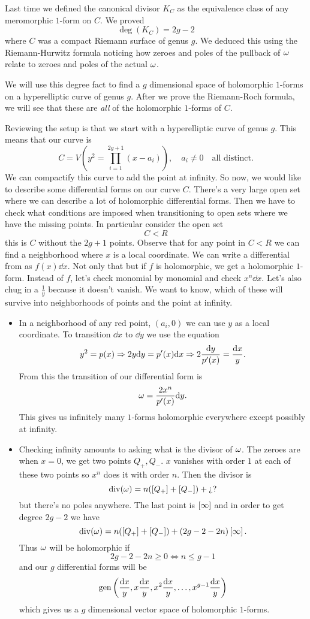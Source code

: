 \documentclass[12pt]{memoir}
\begin{document}
Last time we defined the canonical divisor $K_C$ as the equivalence class of any meromorphic $1$-form on $C$. We proved 
$$\deg(K_C)=2g-2$$
where $C$ was a compact Riemann surface of genus $g$. We deduced this using the Riemann-Hurwitz formula noticing how zeroes and poles of the pullback of $\omega$ relate to zeroes and poles of the actual $\omega$.\par
We will use this degree fact to find a $g$ dimensional space of holomorphic $1$-forms on a hyperelliptic curve of genus $g$. After we prove the Riemann-Roch formula, we will see that these are \emph{all} of the holomorphic $1$-forms of $C$.\par
Reviewing the setup is that we start with a hyperelliptic curve of genus $g$. This means that our curve is 
$$C=V\left(y^2=\prod_{i=1}^{2g+1}(x-a_i)\right),\quad a_i\neq 0\quad\text{all distinct}.$$
We can compactify this curve to add the point at infinity. So now, we would like to describe some differential forms on our curve $C$. There's a very large open set where we can describe a lot of holomorphic differential forms. Then we have to check what conditions are imposed when transitioning to open sets where we have the missing points. In particular consider the open set
$$C\less R$$
this is $C$ without the $2g+1$  points. Observe that for any point in $C\less R$ we can find a neighborhood where $x$ is a local coordinate. We can write a differential from as $f(x)\dd x$. Not only that but if $f$ is holomorphic, we get a holomorphic $1$-form. Instead of $f$, let's check monomial by monomial and check $x^n\dd x$. Let's also chug in a $\frac1y$ because it doesn't vanish. We want to know, which of these will survive into neighborhoods of  points and the point at infinity.
\begin{itemize}
    \item In a neighborhood of any red point, $(a_i,0)$ we can use $y$ as a local coordinate. To transition $\dd x$ to $\dd y$ we use the equation 
    $$y^2=p(x)\Rightarrow 2y\dd y=p'(x)\dd x\Rightarrow 2\frac{\dd y}{p'(x)}=\frac{\dd x}{y}.$$
    From this the transition of our differential form is 
    $$\omega=\frac{2x^n}{p'(x)}\dd y.$$
    This gives us infinitely many $1$-forms holomorphic everywhere except possibly at infinity.
    \item Checking infinity amounts to asking what is the divisor of $\omega$. The zeroes are when $x=0$, we get two points $Q_+,Q_-$. $x$ vanishes with order $1$ at each of these two points so $x^n$ does it with order $n$. Then the divisor is 
    $$\operatorname{div}(\omega)=n(\left\lbrack Q_+\right\rbrack+\left\lbrack Q_-\right\rbrack)+\text{¿?}$$
    but there's no poles anywhere. The last point is $\left\lbrack\infty\right\rbrack$ and in order to get degree $2g-2$ we have
    $$\operatorname{div}(\omega)=n(\left\lbrack Q_+\right\rbrack+\left\lbrack Q_-\right\rbrack)+(2g-2-2n)\left\lbrack\infty\right\rbrack.$$
    Thus $\omega$ will be holomorphic if 
    $$2g-2-2n\geq 0\iff n\leq g-1$$
    and our $g$ differential forms will be 
    $$\operatorname{gen}\left(\frac{\dd x}{y},x\frac{\dd x}{y},x^2\frac{\dd x}{y},\dots,x^{g-1}\frac{\dd x}{y}\right)$$
    which gives us a $g$ dimensional vector space of holomorphic $1$-forms.
\end{itemize}
\end{document}
